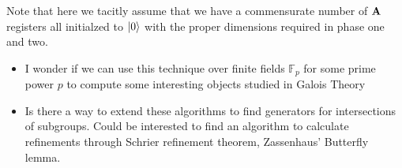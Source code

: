 Note that here we tacitly assume that we have a commensurate number of ${\bf A}$ registers all initialzed to $\ket{0}$ with the proper dimensions required in phase one and two.

\begin{tcolorbox}
  \begin{itemize}
    \item I wonder if we can use this technique over finite fields $\mathbb{F}_p$ for some prime power $p$ to compute some interesting objects studied in Galois Theory
    \item Is there a way to extend these algorithms to find generators for intersections of subgroups. Could be interested to find an algorithm to calculate refinements through Schrier refinement theorem, Zassenhaus' Butterfly lemma.
  \end{itemize}

\end{tcolorbox}




